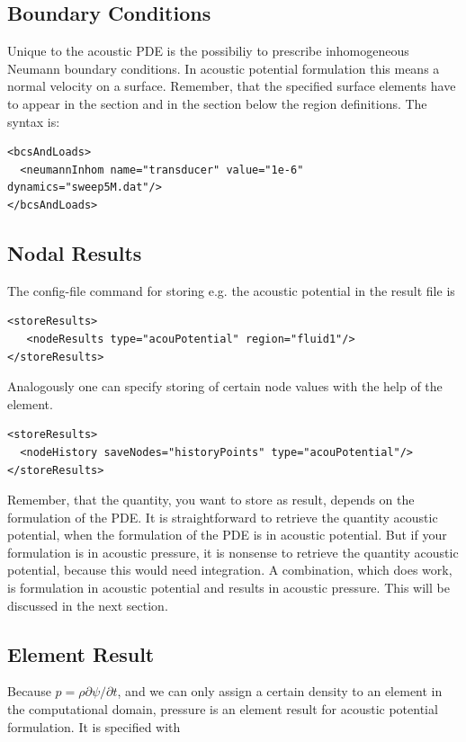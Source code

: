 \subsection{Boundary Conditions}
Unique to the acoustic PDE is the possibiliy to prescribe inhomogeneous Neumann boundary conditions. In acoustic potential formulation this means a normal velocity on a surface. Remember, that the specified surface elements have to appear in the  section and in the  section below the region definitions. The syntax is:

\begin{verbatim} 
<bcsAndLoads>
  <neumannInhom name="transducer" value="1e-6" dynamics="sweep5M.dat"/>
</bcsAndLoads>
\end{verbatim}

\subsection{Nodal Results}
The config-file command for storing e.g. the acoustic potential in the result
file is

\begin{verbatim}      
<storeResults>
   <nodeResults type="acouPotential" region="fluid1"/>
</storeResults>
\end{verbatim}

Analogously one can specify storing of certain node values with the help of the  element.

\begin{verbatim}    
<storeResults>
  <nodeHistory saveNodes="historyPoints" type="acouPotential"/>
</storeResults>
\end{verbatim}

Remember, that the quantity, you want to store as result, depends on the formulation of the PDE. It is straightforward to retrieve the quantity acoustic potential, when the formulation of the PDE is in acoustic potential. But if your formulation is in acoustic pressure, it is nonsense to retrieve the quantity acoustic potential, because this would need integration. A combination, which does work, is formulation in acoustic potential and results in acoustic pressure. This will be discussed in the next section.

\subsection{Element Result}

Because $p = \rho \partial \psi / \partial t$, and we can only assign a certain density to an element in the computational domain, pressure is an element result for acoustic potential formulation. It is specified with

